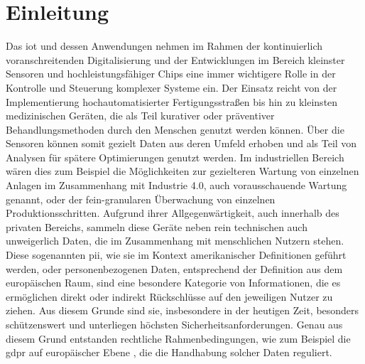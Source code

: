 
\section{Einleitung}
\label{sec:Einleitung}

Das \ac{iot} und dessen Anwendungen nehmen im Rahmen der kontinuierlich voranschreitenden Digitalisierung und der Entwicklungen im Bereich kleinster Sensoren und hochleistungsfähiger Chips eine immer wichtigere Rolle in der Kontrolle und Steuerung komplexer Systeme ein.
Der Einsatz reicht von der Implementierung hochautomatisierter Fertigungsstraßen bis hin zu kleinsten medizinischen Geräten, die als Teil kurativer oder präventiver Behandlungsmethoden durch den Menschen genutzt werden können.
Über die Sensoren können somit gezielt Daten aus deren Umfeld erhoben und als Teil von Analysen für spätere Optimierungen genutzt werden. Im industriellen Bereich wären dies zum Beispiel die Möglichkeiten zur gezielteren Wartung von einzelnen Anlagen im Zusammenhang mit Industrie 4.0, auch vorausschauende Wartung genannt, oder der fein-granularen Überwachung von einzelnen Produktionsschritten.
Aufgrund ihrer Allgegenwärtigkeit, auch innerhalb des privaten Bereichs, sammeln diese Geräte neben rein technischen auch unweigerlich Daten, die im Zusammenhang mit menschlichen Nutzern stehen.
Diese sogenannten \ac{pii}, wie sie im Kontext amerikanischer Definitionen geführt werden, oder personenbezogenen Daten, entsprechend der Definition aus dem europäischen Raum, sind eine besondere Kategorie von Informationen, die es ermöglichen direkt oder indirekt Rückschlüsse auf den jeweiligen Nutzer zu ziehen. Aus diesem Grunde sind sie, insbesondere in der heutigen Zeit, besonders schützenswert und unterliegen höchsten Sicherheitsanforderungen.
Genau aus diesem Grund entstanden rechtliche Rahmenbedingungen, wie zum Beispiel die \ac{gdpr} auf europäischer Ebene \cite{dsgvo2016}, die die Handhabung solcher Daten reguliert.



